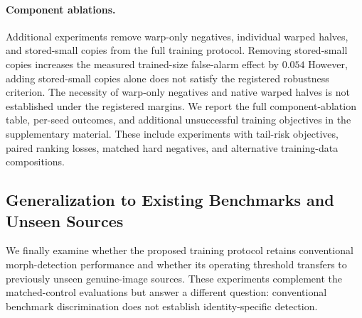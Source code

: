 \paragraph{Component ablations.}
Additional experiments remove warp-only negatives,
individual warped halves, and stored-small copies
from the full training protocol. Removing stored-small copies increases the measured
trained-size false-alarm effect by $0.054$%
However, adding stored-small copies alone does
not satisfy the registered robustness criterion.
The necessity of warp-only negatives and native
warped halves is not established under the
registered margins.
We report the full component-ablation table,
per-seed outcomes, and additional unsuccessful
training objectives in the supplementary material.
These include experiments with tail-risk objectives,
paired ranking losses, matched hard negatives,
and alternative training-data compositions.


\subsection{Generalization to Existing Benchmarks and
Unseen Sources}
\label{sec:benchmark_results}

We finally examine whether the proposed training
protocol retains conventional morph-detection
performance and whether its operating threshold
transfers to previously unseen genuine-image sources. These experiments complement the matched-control
evaluations but answer a different question:
conventional benchmark discrimination does not
establish identity-specific detection.

